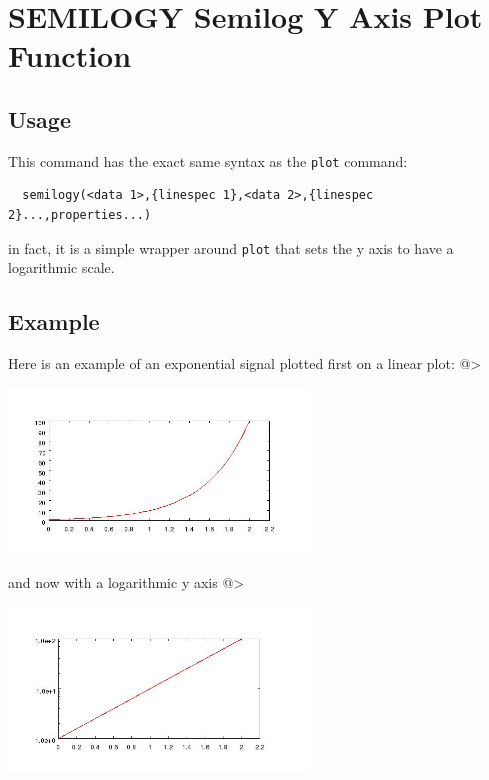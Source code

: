 \section{SEMILOGY Semilog Y Axis Plot Function}

\subsection{Usage}

This command has the exact same syntax as the \verb|plot| command:
\begin{verbatim}
  semilogy(<data 1>,{linespec 1},<data 2>,{linespec 2}...,properties...)
\end{verbatim}
in fact, it is a simple wrapper around \verb|plot| that sets the
y axis to have a logarithmic scale.
\subsection{Example}

Here is an example of an exponential signal plotted first on a linear
plot:
@>


\centerline{\includegraphics[width=8cm]{semilogy1}}

and now with a logarithmic y axis
@>


\centerline{\includegraphics[width=8cm]{semilogy2}}


